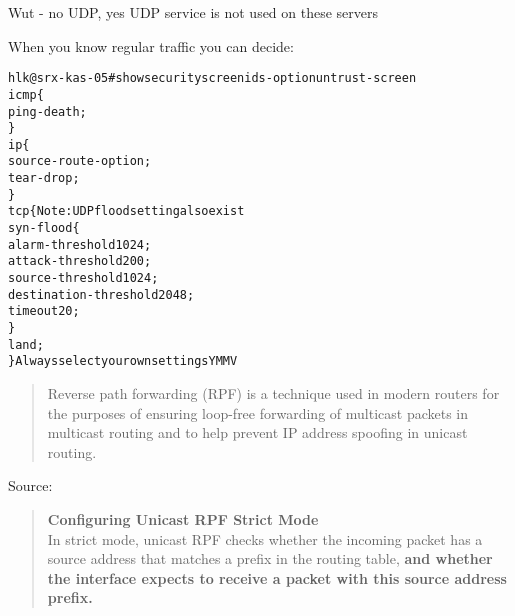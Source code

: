 \documentclass[Screen16to9,17pt]{foils}
\begin{document}
Wut - no UDP, yes UDP service is not used on these servers



When you know regular traffic you can decide:

\begin{alltt}\footnotesize
hlk@srx-kas-05# show security screen ids-option untrust-screen
icmp \{
    ping-death;
\}
ip \{
    source-route-option;
    tear-drop;
\}
tcp \{    Note: UDP flood setting also exist
    syn-flood \{
        alarm-threshold 1024;
        attack-threshold 200;
        source-threshold 1024;
        destination-threshold 2048;
        timeout 20;
    \}
    land;
\} Always select your own settings YMMV
\end{alltt}



\begin{quote}
Reverse path forwarding (RPF) is a technique used in modern routers for the purposes of ensuring loop-free forwarding of multicast packets in multicast routing and to help prevent IP address spoofing in unicast routing.
\end{quote}
Source: 

\begin{quote}
{\bf Configuring Unicast RPF Strict Mode}\\
In strict mode, unicast RPF checks whether the incoming packet has a source address that matches a prefix in the routing table, {\bf and whether the interface expects to receive a packet with this source address prefix.}
\end{quote}




\end{document}
